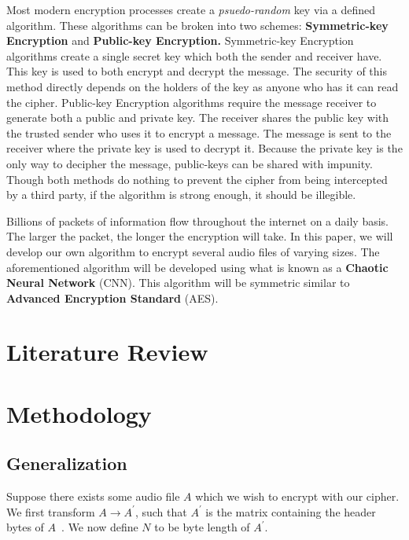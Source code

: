 \documentclass[conference]{IEEEtran}
\begin{document}
Most modern encryption processes create a \textit{psuedo-random} key via a defined algorithm.
These algorithms can be broken into two schemes: \textbf{Symmetric-key Encryption} and \textbf{Public-key Encryption.}
Symmetric-key Encryption algorithms create a single secret key which both the sender and receiver have.
This key is used to both encrypt and decrypt the message.
The security of this method directly depends on the holders of the key as anyone who has it can read the cipher.
Public-key Encryption algorithms require the message receiver to generate both a public and private key.
The receiver shares the public key with the trusted sender who uses it to encrypt a message.
The message is sent to the receiver where the private key is used to decrypt it.
Because the private key is the only way to decipher the message, public-keys can be shared with impunity.
Though both methods do nothing to prevent the cipher from being intercepted by a third party, if the algorithm is strong enough, it should be illegible.

Billions of packets of information flow throughout the internet on a daily basis.
The larger the packet, the longer the encryption will take.
In this paper, we will develop our own algorithm to encrypt several audio files of varying sizes.
The aforementioned algorithm will be developed using what is known as a \textbf{Chaotic Neural Network} (CNN).
This algorithm will be symmetric similar to \textbf{Advanced Encryption Standard} (AES).

\section{Literature Review}\label{sec:literature-review}


\section{Methodology}\label{sec:methodology}

\subsection{Generalization}\label{subsec:generalization}

Suppose there exists some audio file $A$ which we wish to encrypt with our cipher\@.
We first transform $A \rightarrow A^\prime$, such that $A^\prime$ is the matrix containing the header bytes of $A$~\cite{app112110190}.
We now define $N$ to be byte length of $A^\prime$.
\end{document}
